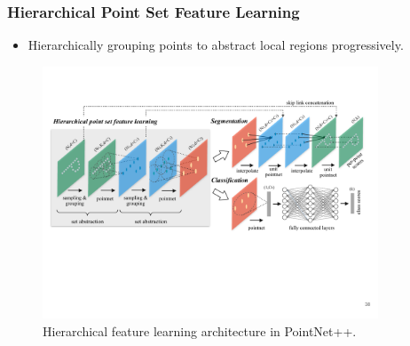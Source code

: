 \documentclass[11pt,xcolor={dvipsnames},hyperref={pdftex,pdfpagemode=UseNone,hidelinks,pdfdisplaydoctitle=true},usepdftitle=false]{beamer}
\begin{document}
\begin{frame}
\frametitle{Hierarchical Point Set Feature Learning}
\begin{itemize}
  \item Hierarchically grouping points to abstract local regions progressively.
\end{itemize}
\begin{figure}
  \includegraphics[width=10cm]{./media/_pointnet/pnpp.pdf}
  \caption{Hierarchical feature learning architecture in PointNet++.}
  \label{fig:arch}
\end{figure}
\end{frame}
\end{document}
